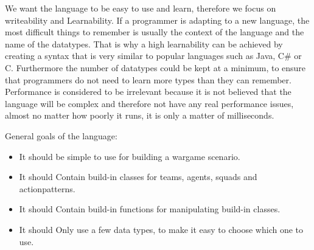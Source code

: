 We want the language to be easy to use and learn, therefore we focus on writeability and Learnability. If a programmer is adapting to a new language, the most difficult things to remember is usually the context of the language and the name of the datatypes. That is why a high learnability can be achieved by creating a syntax that is very similar to popular languages such as Java, C\# or C\cite{langpop}. Furthermore the number of datatypes could be kept at a minimum, to ensure that programmers do not need to learn more types than they can remember.\\
\indent Performance is considered to be irrelevant because it is not believed that the language will be complex and therefore not have any real performance issues, almost no matter how poorly it runs, it is only a matter of milliseconds.\\

\begin{comment}
We want the language to be easy to use and learn, therefore we focus on writeability and Learnability. Writable means that the language should be very easy to write, whereas learnability means that the language should be easy to learn. If a programmer is adapting to a new language, the most difficult things to remember is usually the context of the language and the name of the datatypes. That is why a high learnability can be achieved by creating a syntax that is very similar to popular languages such as Java, C\# or C. Furthermore the number of datatypes could be kept at a minimum, to ensure that programmers do not need to learn more types than they can remember.\\
\indent Performance is considered to be irrelevant because it is not believed that the language will be big enough to have any real performance issues, almost no matter how poorly it runs.\\
\end{comment}
General goals of the language:

\begin{itemize}
	\item It should be simple to use for building a wargame scenario.
	\item It should Contain build-in classes for teams, agents, squads and actionpatterns.
	\item It should Contain build-in functions for manipulating build-in classes.
	\item It should Only use a few data types, to make it easy to choose which one to use.
\end{itemize}

